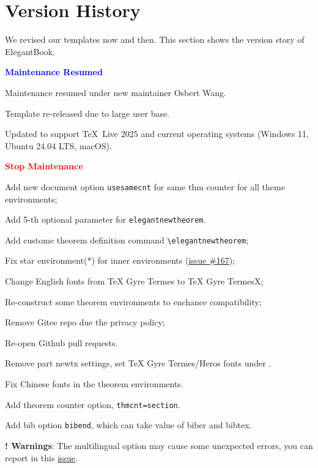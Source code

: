 \documentclass[11pt]{elegantbook}
\begin{document}
\chapter{Version History}
We revised our templates now and then. This section shows the version story of ElegantBook.

  \textcolor{blue}{\bfseries Maintenance Resumed}

\begin{change}
  \item Maintenance resumed under new maintainer Osbert Wang.
  \item Template re-released due to large user base.
  \item Updated to support \TeX~Live 2025 and current operating systems (Windows 11, Ubuntu 24.04 LTS, macOS).
\end{change}

  \textcolor{red}{\bfseries Stop Maintenance}

\begin{change}
  \item Add new document option \lstinline|usesamecnt| for same thm counter for all theme environments;
  \item Add 5-th optional parameter for \lstinline|elegantnewtheorem|.
\end{change}



\begin{change}
  \item Add custome theorem definition command \lstinline{\elegantnewtheorem};
  \item Fix star environment(*) for inner environments (\href{https://github.com/ElegantLaTeX/ElegantBook/issues/167}{issue \#167});
  \item Change English fonts from TeX Gyre Termes to TeX Gyre TermesX;
  \item Re-construct some theorem environments to enchance compatibility;
  \item Remove Gitee repo due the privacy policy;
  \item Re-open Github pull requests.
\end{change}





\begin{change}
  \item Remove part newtx settings, set TeX Gyre Termes/Heros fonts under .
  \item Fix Chinese fonts in the theorem environments.
  \item Add theorem counter option, \lstinline{thmcnt=section}.
  \item Add bib option \lstinline{bibend}, which can take value of biber and bibtex.
  \item \textbf{! Warnings}: The multilingual option may cause some unexpected errors, you can report in this \href{https://github.com/ElegantLaTeX/ElegantBook/issues/170}{issue}.
\end{change}
\end{document}
